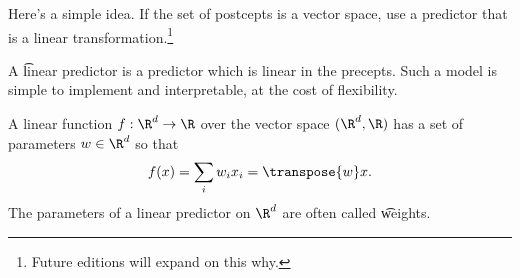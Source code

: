 

Here's a simple idea.
If the set of postcepts is a vector space, use a predictor that is a linear transformation.\footnote{Future editions will expand on this why.}


A \t{linear predictor} is a predictor which is linear in the precepts.
Such a model is simple to implement and interpretable, at the cost of flexibility.


A linear function $f: \R^d \to \R$ over the vector space $(\R^d, \R)$ has a set of parameters $w \in \R^d$ so that \[
  f(x) = \sum_{i} w_ix_i = \transpose{w}x.
\]
The parameters of a linear predictor on $\R^d$ are often called \t{weights}.

\blankpage
